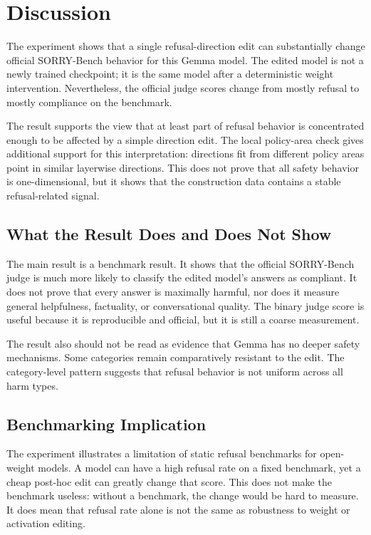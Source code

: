 \section{Discussion}

The experiment shows that a single refusal-direction edit can substantially
change official SORRY-Bench behavior for this Gemma model. The edited model is
not a newly trained checkpoint; it is the same model after a deterministic
weight intervention. Nevertheless, the official judge scores change from mostly
refusal to mostly compliance on the benchmark.

The result supports the view that at least part of refusal behavior is
concentrated enough to be affected by a simple direction edit. The local
policy-area check gives additional support for this interpretation: directions
fit from different policy areas point in similar layerwise directions. This does
not prove that all safety behavior is one-dimensional, but it shows that the
construction data contains a stable refusal-related signal.

\subsection{What the Result Does and Does Not Show}

The main result is a benchmark result. It shows that the official SORRY-Bench
judge is much more likely to classify the edited model's answers as compliant.
It does not prove that every answer is maximally harmful, nor does it measure
general helpfulness, factuality, or conversational quality. The binary judge
score is useful because it is reproducible and official, but it is still a
coarse measurement.

The result also should not be read as evidence that Gemma has no deeper safety
mechanisms. Some categories remain comparatively resistant to the edit. The
category-level pattern suggests that refusal behavior is not uniform across all
harm types.

\subsection{Benchmarking Implication}

The experiment illustrates a limitation of static refusal benchmarks for
open-weight models. A model can have a high refusal rate on a fixed benchmark,
yet a cheap post-hoc edit can greatly change that score. This does not make the
benchmark useless: without a benchmark, the change would be hard to measure. It
does mean that refusal rate alone is not the same as robustness to weight or
activation editing.

